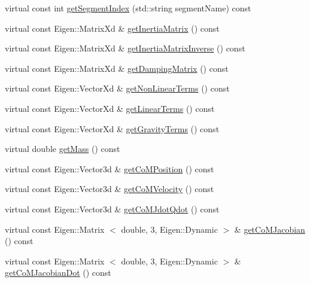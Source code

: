\begin{DoxyCompactItemize}
\item 
virtual const int \hyperlink{classocra__icub_1_1OcraWbiModel_a1d0f2eb31988a8c91b11a3343392fcf9}{get\-Segment\-Index} (std\-::string segment\-Name) const 
\item 
virtual const \-Eigen\-::\-Matrix\-Xd \& \hyperlink{classocra__icub_1_1OcraWbiModel_a49df5e4d811b660c72b35b6d822bb529}{get\-Inertia\-Matrix} () const 
\item 
virtual const \-Eigen\-::\-Matrix\-Xd \& \hyperlink{classocra__icub_1_1OcraWbiModel_a2dfc6cc2f527cc3aec668607b36e5fe9}{get\-Inertia\-Matrix\-Inverse} () const 
\item 
virtual const \-Eigen\-::\-Matrix\-Xd \& \hyperlink{classocra__icub_1_1OcraWbiModel_ae8bc8fbe99ae23b45a40ec867ca066f9}{get\-Damping\-Matrix} () const 
\item 
virtual const \-Eigen\-::\-Vector\-Xd \& \hyperlink{classocra__icub_1_1OcraWbiModel_a8cf1d870edf8c069cb1b196e0cab1f67}{get\-Non\-Linear\-Terms} () const 
\item 
virtual const \-Eigen\-::\-Vector\-Xd \& \hyperlink{classocra__icub_1_1OcraWbiModel_aa85e588223e6c40dabb740089b2cf3ea}{get\-Linear\-Terms} () const 
\item 
virtual const \-Eigen\-::\-Vector\-Xd \& \hyperlink{classocra__icub_1_1OcraWbiModel_a57742157dce7e3526a388be7d11321d3}{get\-Gravity\-Terms} () const 
\item 
virtual double \hyperlink{classocra__icub_1_1OcraWbiModel_a7f52d830940df32916f46b905d985505}{get\-Mass} () const 
\item 
virtual const \-Eigen\-::\-Vector3d \& \hyperlink{classocra__icub_1_1OcraWbiModel_a3af6973d940c01a80085d65841bb27a8}{get\-Co\-M\-Position} () const 
\item 
virtual const \-Eigen\-::\-Vector3d \& \hyperlink{classocra__icub_1_1OcraWbiModel_af7f16945aafd4881f1cfd94498a78ebf}{get\-Co\-M\-Velocity} () const 
\item 
virtual const \-Eigen\-::\-Vector3d \& \hyperlink{classocra__icub_1_1OcraWbiModel_a0985fe02b87fa9bcf90439163c622a71}{get\-Co\-M\-Jdot\-Qdot} () const 
\item 
virtual const \-Eigen\-::\-Matrix\*
$<$ double, 3, \-Eigen\-::\-Dynamic $>$ \& \hyperlink{classocra__icub_1_1OcraWbiModel_abc79b9dec9e96e4e8125d26c6be479d6}{get\-Co\-M\-Jacobian} () const 
\item 
virtual const \-Eigen\-::\-Matrix\*
$<$ double, 3, \-Eigen\-::\-Dynamic $>$ \& \hyperlink{classocra__icub_1_1OcraWbiModel_acc2992d42ea92d55e172622c83ec1bdc}{get\-Co\-M\-Jacobian\-Dot} () const 

\end{DoxyCompactItemize}
